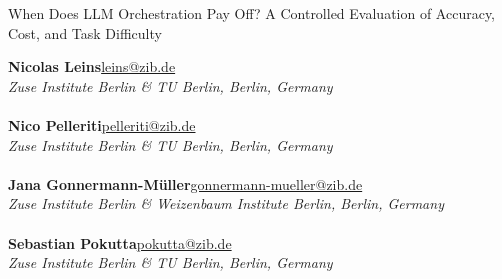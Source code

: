 \documentclass[a4paper]{article}
\theoremstyle{plain}
\theoremstyle{definition}
\theoremstyle{remark}
\begin{document}
\begin{center}
{\Large When Does LLM Orchestration Pay Off? A Controlled Evaluation of Accuracy, Cost, and Task Difficulty}
\end{center}

\vspace{7mm}

\noindent\textbf{Nicolas Leins}\hfill\href{mailto:leins@zib.de}{\ttfamily leins@zib.de}\\
\emph{\small Zuse Institute Berlin \& TU Berlin, Berlin, Germany}\\
\\
\textbf{Nico Pelleriti}\hfill\href{mailto:pelleriti@zib.de}{\ttfamily pelleriti@zib.de}\\
\emph{\small Zuse Institute Berlin \& TU Berlin, Berlin, Germany}\\
\\
\textbf{Jana Gonnermann-Müller}\hfill\href{mailto:gonnermann-mueller@zib.de}{\ttfamily gonnermann-mueller@zib.de}\\
\emph{\small Zuse Institute Berlin \& Weizenbaum Institute Berlin, Berlin, Germany}\\
\\
\textbf{Sebastian Pokutta}\hfill\href{mailto:pokutta@zib.de}{\ttfamily pokutta@zib.de}\\
\emph{\small Zuse Institute Berlin \& TU Berlin, Berlin, Germany}\\

\vspace{5mm}
\end{document}
